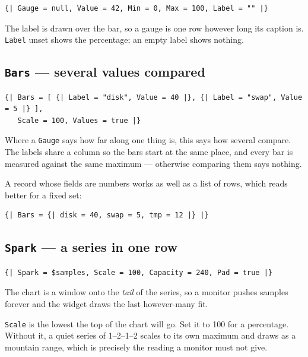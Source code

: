 \documentclass[11pt,a4paper,twoside,openany]{book}
\newcommand{\code}[1]{\texttt{\small #1}}
\begin{document}
\begin{lstlisting}
{| Gauge = null, Value = 42, Min = 0, Max = 100, Label = "" |}
\end{lstlisting}

The label is drawn over the bar, so a gauge is one row however long its caption
is. \code{Label} unset shows the percentage; an empty label shows nothing.

\subsection{\texttt{Bars} --- several values compared}

\begin{lstlisting}
{| Bars = [ {| Label = "disk", Value = 40 |}, {| Label = "swap", Value = 5 |} ],
   Scale = 100, Values = true |}
\end{lstlisting}

Where a \code{Gauge} says how far along one thing is, this says how several compare.
The labels share a column so the bars start at the same place, and every bar is
measured against the same maximum --- otherwise comparing them says nothing.

A record whose fields are numbers works as well as a list of rows, which reads better
for a fixed set:

\begin{lstlisting}
{| Bars = {| disk = 40, swap = 5, tmp = 12 |} |}
\end{lstlisting}

\subsection{\texttt{Spark} --- a series in one row}

\begin{lstlisting}
{| Spark = $samples, Scale = 100, Capacity = 240, Pad = true |}
\end{lstlisting}

The chart is a window onto the \emph{tail} of the series, so a monitor pushes
samples forever and the widget draws the last however-many fit.

\begin{notebox}
\code{Scale} is the lowest the top of the chart will go. Set it to 100 for a
percentage. Without it, a quiet series of 1--2--1--2 scales to its own maximum and
draws as a mountain range, which is precisely the reading a monitor must not give.
\end{notebox}
\end{document}
